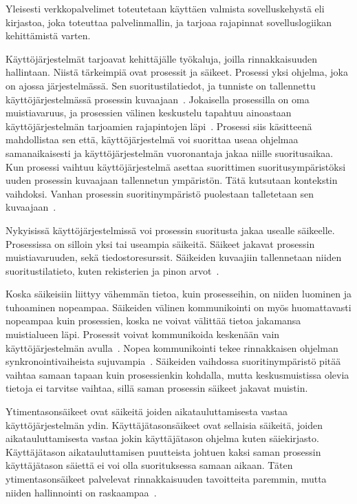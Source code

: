 \documentclass[12pt]{article}
\begin{document}
Yleisesti verkkopalvelimet toteutetaan käyttäen valmista sovelluskehystä eli kirjastoa,
joka toteuttaa palvelinmallin, ja tarjoaa rajapinnat sovelluslogiikan
kehittämistä varten.

Käyttöjärjestelmät tarjoavat kehittäjälle työkaluja, joilla rinnakkaisuuden hallintaan.
Niistä tärkeimpiä ovat prosessit ja säikeet.
Prosessi yksi ohjelma, joka on ajossa järjestelmässä. Sen suoritustilatiedot, ja tunniste on
tallennettu käyttöjärjestelmässä prosessin kuvaajaan~\cite{stallings_operating_2018}.
Jokaisella
prosessilla on oma muistiavaruus, ja prosessien välinen keskustelu
tapahtuu ainoastaan käyttöjärjestelmän tarjoamien rajapintojen läpi~\cite{stallings_operating_2018}.
Prosessi siis käsitteenä mahdollistaa sen että, käyttöjärjestelmä
voi suorittaa useaa ohjelmaa samanaikaisesti ja käyttöjärjestelmän
vuoronantaja jakaa niille suoritusaikaa. Kun prosessi vaihtuu
käyttöjärjestelmä asettaa suorittimen suoritusympäristöksi
uuden prosessin kuvaajaan tallennetun ympäristön. Tätä kutsutaan kontekstin
vaihdoksi. Vanhan prosessin suoritinympäristö puolestaan talletetaan sen 
kuvaajaan~\cite{stallings_operating_2018}.

Nykyisissä käyttöjärjestelmissä voi prosessin suoritusta jakaa usealle
säikeelle. Prosessissa on silloin yksi tai useampia säikeitä.
Säikeet jakavat prosessin muistiavaruuden, sekä tiedostoresurssit.
Säikeiden kuvaajiin
tallennetaan niiden suoritustilatieto,
kuten rekisterien ja pinon arvot~\cite{stallings_operating_2018}.

Koska säikeisiin liittyy vähemmän tietoa, kuin prosesseihin,
on niiden luominen ja tuhoaminen nopeampaa. Säikeiden välinen
kommunikointi on myös huomattavasti nopeampaa kuin prosessien, koska
ne voivat välittää tietoa jakamansa muistialueen läpi.
Prosessit voivat kommunikoida keskenään vain käyttöjärjestelmän 
avulla~\cite{stallings_operating_2018}.
Nopea
kommunikointi tekee rinnakkaisen ohjelman synkronointivaiheista
sujuvampia~\cite{stallings_operating_2018}. Säikeiden vaihdossa suoritinympäristö pitää vaihtaa 
samaan tapaan kuin prosessienkin kohdalla, mutta keskusmuistissa olevia
tietoja ei tarvitse vaihtaa, sillä saman prosessin säikeet jakavat
muistin.

Ytimentasonsäikeet ovat säikeitä joiden aikatauluttamisesta vastaa
käyttöjärjestelmän ydin. Käyttäjätasonsäikeet ovat sellaisia säikeitä,
joiden aikatauluttamisesta vastaa jokin käyttäjätason ohjelma kuten
säiekirjasto. Käyttäjätason aikatauluttamisen puutteista johtuen
kaksi saman prosessin käyttäjätason säiettä ei voi olla suorituksessa
samaan aikaan. Täten ytimentasonsäikeet palvelevat rinnakkaisuuden tavoitteita
paremmin, mutta niiden hallinnointi on raskaampaa~\cite{stallings_operating_2018}.
\end{document}
